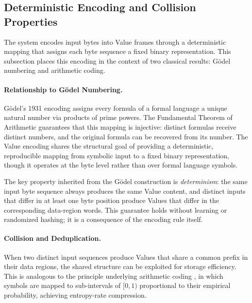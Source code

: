 \subsection{Deterministic Encoding and Collision Properties}
\label{sec:related_godel_arithmetic}

The system encodes input bytes into Value frames through a deterministic
mapping that assigns each byte sequence a fixed binary representation.
This subsection places this encoding in the context of two classical
results: G\"{o}del numbering and arithmetic coding.

\paragraph{Relationship to G\"{o}del Numbering.}
G\"{o}del's 1931 encoding assigns every formula of a formal language a
unique natural number via products of prime powers.  The Fundamental
Theorem of Arithmetic guarantees that this mapping is injective: distinct
formulas receive distinct numbers, and the original formula can be
recovered from its number.  The Value encoding shares the structural
goal of providing a deterministic, reproducible mapping from symbolic
input to a fixed binary representation, though it operates at the byte
level rather than over formal language symbols.

The key property inherited from the G\"{o}del construction is
\emph{determinism}: the same input byte sequence always produces the
same Value content, and distinct inputs that differ in at least one byte
position produce Values that differ in the corresponding data-region
words.  This guarantee holds without learning or randomized hashing; it
is a consequence of the encoding rule itself.

\paragraph{Collision and Deduplication.}
When two distinct input sequences produce Values that share a common
prefix in their data regions, the shared structure can be exploited for
storage efficiency.  This is analogous to the principle underlying
arithmetic coding \citep{witten1987arithmetic}, in which symbols are
mapped to sub-intervals of $[0, 1)$ proportional to their empirical
probability, achieving entropy-rate compression.

